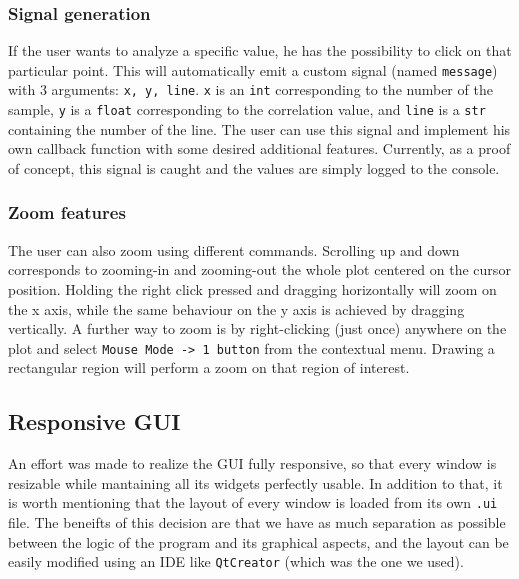 \documentclass[11pt,a4paper]{article}
\begin{document}
\subsubsection{Signal generation}
If the user wants to analyze a specific value, he has the possibility to click on that particular point.
This will automatically emit a custom signal (named \texttt{message}) with 3 arguments: \texttt{x, y, line}.
\texttt{x} is an \texttt{int} corresponding to the number of the sample, \texttt{y} is a \texttt{float} corresponding to the correlation value, and \texttt{line} is a \texttt{str} containing the number of the line.
The user can use this signal and implement his own callback function with some desired additional features.
Currently, as a proof of concept, this signal is caught and the values are simply logged to the console.

\subsubsection{Zoom features}
The user can also zoom using different commands.
Scrolling up and down corresponds to zooming-in and zooming-out the whole plot centered on the cursor position.
Holding the right click pressed and dragging horizontally will zoom on the x axis, while the same behaviour on the y axis is achieved by dragging vertically.
A further way to zoom is by right-clicking (just once) anywhere on the plot and select \texttt{Mouse Mode -> 1 button} from the contextual menu. Drawing a rectangular region will perform a zoom on that region of interest.

\subsection{Responsive GUI}
An effort was made to realize the GUI fully responsive, so that every window is resizable while mantaining all its widgets perfectly usable.
In addition to that, it is worth mentioning that the layout of every window is loaded from its own \texttt{.ui} file.
The beneifts of this decision are that we have as much separation as possible between the logic of the program and its graphical aspects, and the layout can be easily modified using an IDE like \texttt{QtCreator} (which was the one we used).
\end{document}
